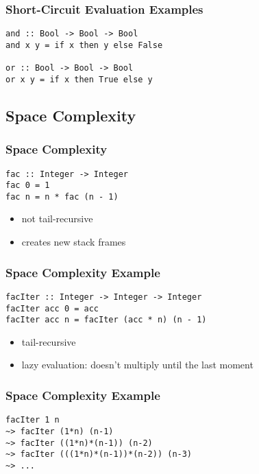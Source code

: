 \documentclass[dvipsnames]{beamer}
\theoremstyle{plain}
\begin{document}
\begin{frame}[fragile]
  \frametitle{Short-Circuit Evaluation Examples}

  \begin{lstlisting}[deletekeywords={and,not,or}]
and :: Bool -> Bool -> Bool
and x y = if x then y else False

or :: Bool -> Bool -> Bool
or x y = if x then True else y
  \end{lstlisting}
\end{frame}

\subsection{Space Complexity}

\begin{frame}[fragile]
  \frametitle{Space Complexity}

  \begin{exampleblock}{}
    \begin{lstlisting}
fac :: Integer -> Integer
fac 0 = 1
fac n = n * fac (n - 1)
    \end{lstlisting}
  \end{exampleblock}

  \begin{itemize}
    \item not tail-recursive
    \item creates new stack frames
  \end{itemize}
\end{frame}

\begin{frame}[fragile]
  \frametitle{Space Complexity Example}

  \begin{exampleblock}{}
    \begin{lstlisting}
facIter :: Integer -> Integer -> Integer
facIter acc 0 = acc
facIter acc n = facIter (acc * n) (n - 1)
    \end{lstlisting}
  \end{exampleblock}

  \begin{itemize}
    \item tail-recursive
    \item lazy evaluation: doesn't multiply until the last moment
  \end{itemize}
\end{frame}

\begin{frame}[fragile]
  \frametitle{Space Complexity Example}

  \begin{lstlisting}
facIter 1 n
~> facIter (1*n) (n-1)
~> facIter ((1*n)*(n-1)) (n-2)
~> facIter (((1*n)*(n-1))*(n-2)) (n-3)
~> ...
  \end{lstlisting}
\end{frame}
\end{document}
